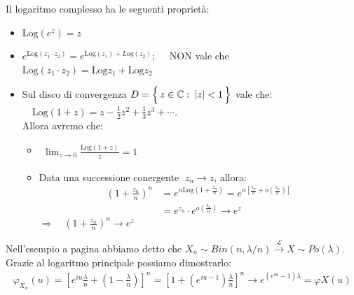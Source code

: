 \bigskip
\noindent Il logaritmo complesso ha le seguenti proprietà:
\begin{itemize}
    \item $\text{Log}(e^z) = z$
    \item $e^{\text{Log}(z_1\cdot z_2)} = e^{\text{Log}(z_1) + Log(z_2)};\quad$  NON vale che $\text{Log}(z_1\cdot z_2) = \text{Log}z_1 + \text{Log}z_2$
    \item Sul disco di convergenza $D = \Bigl\{\,z\in\mathbb C:\;|z|<1\,\Bigr\}$ vale che:
    \(\quad \text{Log}(1+z) = z-\frac12 z^2 + \frac13 z^3 + \cdots\).\\
    Allora avremo che:
    \begin{itemize}
        \item $\begin{aligned} \lim_{z\to 0}\frac{\text{Log}(1+z)}{z} =1\end{aligned}$
        \item Data una successione conergente $\;z_n\longrightarrow z$, allora:
        \begin{align*}
            \left(1+\frac{z_n}{n}\right)^n & = e^{n\text{Log}\left(1+\frac{z_n}{n}\right)} = e^{n\left[\frac{z_n}{n} + o\left(\frac{z_n}{n}\right)\right]}\\
             & = e^{z_n} \cdot e^{o\left(\frac{z_n}{n}\right)} \longrightarrow e^z
        \end{align*}
        $\Rightarrow \quad \left(1+\frac{z_n}{n}\right)^n\longrightarrow e^z$
    \end{itemize}
\end{itemize}

\begin{esempio}
    Nell'esempio a pagina \pageref{es:convlegge} abbiamo detto che $X_n\sim Bin(n , \lambda/n) \overset{\mathcal{L}}{\longrightarrow} X\sim Po(\lambda).$ Grazie al logaritmo principale possiamo dimostrarlo:
    \begin{align*}
        \varphi_{X_n}(u) = \left[e^{iu} \frac \lambda n + \left(1-\frac{\lambda}{n}\right)\right]^n = \left[1+\left(e^{iu-1}\right)\frac\lambda n\right]
        ^n \longrightarrow e^{(e^{iu}-1)\lambda} = \varphi X(u)
    \end{align*}
\end{esempio}

\newpage 